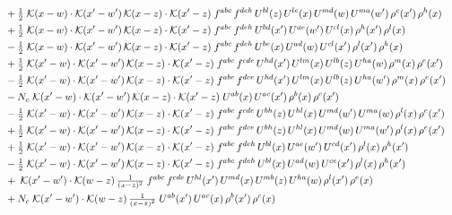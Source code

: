 \documentclass[10pt]{article}
\numberwithin{equation}{section}
\begin{document}
\begin{align}
&\quad +\tfrac{1}{2}\;\mathcal{K}(x-w)\cdot\mathcal{K}(x'-w')\,\mathcal{K}(x-z)\cdot\mathcal{K}(x'-z)\;f^{abc}\,f^{deh}\,U^{bl}(z)\,U^{le}(x)\,U^{md}(w)\,U^{ma}(w')\,\rho^{c}(x')\,\rho^{h}(x)\notag\\
&\quad +\tfrac{1}{2}\;\mathcal{K}(x-w)\cdot\mathcal{K}(x'-w')\,\mathcal{K}(x-z)\cdot\mathcal{K}(x'-z)\;f^{abc}\,f^{deh}\,U^{bd}(x')\,U^{ae}(w')\,U^{cl}(x)\,\rho^{h}(x')\,\rho^{l}(x)\notag\\
&\quad -\tfrac{1}{2}\;\mathcal{K}(x-w)\cdot\mathcal{K}(x'-w')\,\mathcal{K}(x-z)\cdot\mathcal{K}(x'-z)\;f^{abc}\,f^{deh}\,U^{be}(x)\,U^{ad}(w)\,U^{cl}(x')\,\rho^{l}(x')\,\rho^{h}(x)\notag\\
&\quad +\tfrac{1}{2}\;\mathcal{K}(x'-w)\cdot\mathcal{K}(x'-w')\,\mathcal{K}(x-z)\cdot\mathcal{K}(x'-z)\;f^{abc}\,f^{cde}\,U^{hd}(x')\,U^{lm}(x)\,U^{lb}(z)\,U^{ha}(w)\,\rho^{m}(x)\,\rho^{e}(x')\notag\\
&\quad -\tfrac{1}{2}\;\mathcal{K}(x'-w)\cdot\mathcal{K}(x'-w')\,\mathcal{K}(x-z)\cdot\mathcal{K}(x'-z)\;f^{abc}\,f^{dce}\,U^{hd}(x')\,U^{lm}(x)\,U^{lb}(z)\,U^{ha}(w')\,\rho^{m}(x)\,\rho^{e}(x')\notag\\
&\quad -N_c\;\mathcal{K}(x'-w)\cdot\mathcal{K}(x'-w')\,\mathcal{K}(x-z)\cdot\mathcal{K}(x'-z)\;U^{ab}(x)\,U^{ac}(x')\,\rho^{b}(x)\,\rho^{c}(x')\notag\\
&\quad -\tfrac{1}{2}\;\mathcal{K}(x'-w)\cdot\mathcal{K}(x'-w')\,\mathcal{K}(x-z)\cdot\mathcal{K}(x'-z)\;f^{abc}\,f^{cde}\,U^{bh}(z)\,U^{hl}(x)\,U^{md}(w')\,U^{ma}(w)\,\rho^{l}(x)\,\rho^{e}(x')\notag\\
&\quad +\tfrac{1}{2}\;\mathcal{K}(x'-w)\cdot\mathcal{K}(x'-w')\,\mathcal{K}(x-z)\cdot\mathcal{K}(x'-z)\;f^{abc}\,f^{dce}\,U^{bh}(z)\,U^{hl}(x)\,U^{md}(w)\,U^{ma}(w')\,\rho^{l}(x)\,\rho^{e}(x')\notag\\
&\quad +\tfrac{1}{2}\;\mathcal{K}(x'-w)\cdot\mathcal{K}(x'-w')\,\mathcal{K}(x-z)\cdot\mathcal{K}(x'-z)\;f^{abc}\,f^{deh}\,U^{bl}(x)\,U^{ae}(w')\,U^{cd}(x')\,\rho^{l}(x)\,\rho^{h}(x')\notag\\
&\quad -\tfrac{1}{2}\;\mathcal{K}(x'-w)\cdot\mathcal{K}(x'-w')\,\mathcal{K}(x-z)\cdot\mathcal{K}(x'-z)\;f^{abc}\,f^{deh}\,U^{bl}(x)\,U^{ad}(w)\,U^{ce}(x')\,\rho^{l}(x)\,\rho^{h}(x')\notag\\
&\quad +\;\mathcal{K}(x'-w')\cdot\mathcal{K}(w-z)\,\tfrac{1}{(x-z)^{2}}\;f^{abc}\,f^{cde}\,U^{hl}(x')\,U^{md}(x)\,U^{mb}(z)\,U^{ha}(w)\,\rho^{l}(x')\,\rho^{e}(x)\notag\\
&\quad +N_c\;\mathcal{K}(x'-w')\cdot\mathcal{K}(w-z)\,\tfrac{1}{(x-z)^{2}}\;U^{ab}(x')\,U^{ac}(x)\,\rho^{b}(x')\,\rho^{c}(x)\notag\\

\end{align}
\end{document}

